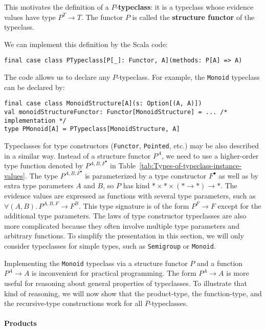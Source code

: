 This motivates the definition of  a $P$-\textbf{typeclass}:
it is a typeclass whose evidence values have type $P^{T}\rightarrow T$.
The functor $P$ is called the \textbf{structure
functor} of the typeclass.

We can implement this definition by the Scala code:
\begin{lstlisting}
final case class PTypeclass[P[_]: Functor, A](methods: P[A] => A)
\end{lstlisting}
The code allows us to declare any $P$-typeclass. For example, the
\lstinline!Monoid! typeclass can be declared by:
\begin{lstlisting}
final case class MonoidStructure[A](s: Option[(A, A)])
val monoidStructureFunctor: Functor[MonoidStructure] = ... /* implementation */
type PMonoid[A] = PTypeclass[MonoidStructure, A]
\end{lstlisting}

Typeclasses for type constructors (\lstinline!Functor!, \lstinline!Pointed!,
etc.) may be also described in a similar way. Instead of a structure
functor $P^{A}$, we need to use a higher-order type function denoted
by $P^{A,B,F^{\bullet}}$ in Table~\ref{tab:Types-of-typeclass-instance-values}.
The type $P^{A,B,F^{\bullet}}$ is parameterized by a type constructor
$F^{\bullet}$ as well as by extra type parameters $A$ and $B$,
so $P$ has kind $*\times*\times(*\rightarrow*)\rightarrow*$. The
evidence values are expressed as functions with several type parameters,
such as $\forall(A,B).\,P^{A,B,F}\rightarrow F^{B}$. This type signature
is of the form $P^{F}\rightarrow F$ except for the additional type
parameters. The laws of type constructor typeclasses are also more
complicated because they often involve multiple type parameters and
arbitrary functions. To simplify the presentation in this section,
we will only consider typeclasses for simple types, such as \lstinline!Semigroup!
or \lstinline!Monoid!.

Implementing the \lstinline!Monoid! typeclass via a structure functor
$P$ and a function $P^{A}\rightarrow A$ is inconvenient for practical
programming. The form $P^{A}\rightarrow A$ is more useful for reasoning
about general properties of typeclasses. To illustrate that kind of
reasoning, we will now show that the product-type, the function-type,
and the recursive-type constructions work for all $P$-typeclasses. 

\paragraph{Products}

